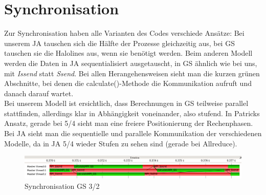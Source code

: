 \documentclass[a4paper,10pt]{article}
\begin{document}
\section{Synchronisation}
Zur Synchronisation haben alle Varianten des Codes verschiede Ansätze: Bei unserem JA tauschen sich die Hälfte der Prozesse gleichzeitig aus, bei GS tauschen sie die Halolines aus, wenn sie benötigt werden. Beim anderen Modell werden die Daten in JA sequentialisiert ausgetauscht, in GS ähnlich wie bei uns, mit \textit{Issend} statt \textit{Ssend}. Bei allen Herangehensweisen sieht man die kurzen grünen Abschnitte, bei denen die calculate()-Methode die Kommunikation aufruft und danach darauf wartet.\\

Bei unserem Modell ist ersichtlich, dass Berechnungen in GS teilweise parallel stattfinden, allerdings klar in Abhängigkeit voneinander, also stufend. In Patricks Ansatz, gerade bei 5/4 sieht man eine freiere Positionierung der Rechenphasen.\\

Bei JA sieht man die sequentielle und parallele Kommunikation der verschiedenen Modelle, da in JA 5/4 wieder Stufen zu sehen sind (gerade bei Allreduce).

\begin{figure}[h!]
 \caption{Synchronisation GS 3/2}
 \includegraphics[width=14cm]{c_sync_GS_3x2.png}
\end{figure}
\end{document}
